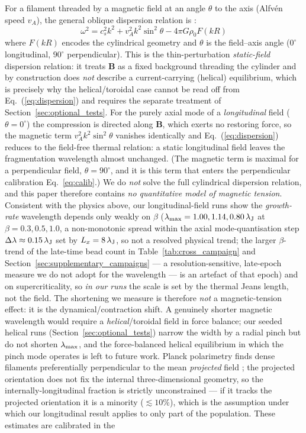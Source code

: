 \documentclass[usenatbib,twoside,twocolumn]{mnras}
\begin{document}
For a filament threaded by a magnetic field at an angle $\theta$ to the axis (Alfv\'en speed $v_A$), the general oblique dispersion relation is \citep{Nakamura1993}:
\begin{equation}
\omega^2 = c_s^2 k^2 + v_A^2 k^2 \sin^2\theta - 4\pi G\rho_0 F(kR)
\label{eq:dispersion}
\end{equation}
where $F(kR)$ encodes the cylindrical geometry and $\theta$ is the field--axis angle ($0^\circ$ longitudinal, $90^\circ$ perpendicular). This is the thin-perturbation \emph{static-field} dispersion relation: it treats $\mathbf{B}$ as a fixed background threading the cylinder and by construction does \emph{not} describe a current-carrying (helical) equilibrium, which is precisely why the helical/toroidal case cannot be read off from Eq.~(\ref{eq:dispersion}) and requires the separate treatment of Section~\ref{sec:optional_tests}. For the purely axial mode of a \emph{longitudinal} field ($\theta=0^\circ$) the compression is directed along $\mathbf{B}$, which exerts no restoring force, so the magnetic term $v_A^2k^2\sin^2\theta$ vanishes identically and Eq.~(\ref{eq:dispersion}) reduces to the field-free thermal relation: a static longitudinal field leaves the fragmentation wavelength almost unchanged. (The magnetic term is maximal for a perpendicular field, $\theta=90^\circ$, and it is this term that enters the perpendicular calibration Eq.~\ref{eq:calib}.) We do \emph{not} solve the full cylindrical dispersion relation, and this paper therefore contains \emph{no quantitative model of magnetic tension}. Consistent with the physics above, our longitudinal-field runs show the \emph{growth-rate} wavelength depends only weakly on $\beta$ ($\lambda_{\rm max}=1.00,1.14,0.80\,\lambda_{\rm J}$ at $\beta=0.3,0.5,1.0$, a non-monotonic spread within the axial mode-quantisation step $\Delta\lambda\approx0.15\,\lambda_{\rm J}$ set by $L_x=8\,\lambda_{\rm J}$, so not a resolved physical trend; the larger $\beta$-trend of the late-time bead count in Table~\ref{tab:cross_campaign} and Section~\ref{sec:supplementary_campaigns} --- a resolution-sensitive, late-epoch measure we do not adopt for the wavelength --- is an artefact of that epoch) and on supercriticality, so \emph{in our runs} the scale is set by the thermal Jeans length, not the field. The shortening we measure is therefore \emph{not} a magnetic-tension effect: it is the dynamical/contraction shift. A genuinely shorter magnetic wavelength would require a \emph{helical}/toroidal field in force balance; our seeded helical runs (Section~\ref{sec:optional_tests}) narrow the width by a radial pinch but do not shorten $\lambda_{\rm max}$, and the force-balanced helical equilibrium in which the \citet{Fiege2000} pinch mode operates is left to future work. Planck polarimetry finds dense filaments preferentially perpendicular to the mean \emph{projected} field \citep{Jadhav2026}; the projected orientation does not fix the internal three-dimensional geometry, so the internally-longitudinal fraction is strictly unconstrained --- if it tracks the projected orientation it is a minority ($\lesssim10\%$), which is the assumption under which our longitudinal result applies to only part of the population. These estimates are calibrated in the 
\end{document}
